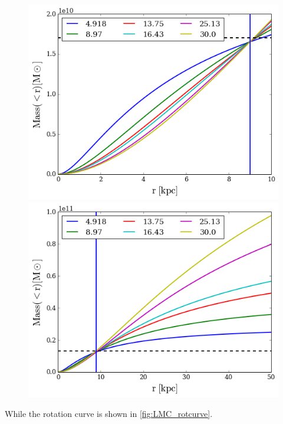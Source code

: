 \begin{figure}[H]{\label{fig:LMC_mass}}
\centering
\includegraphics[scale=0.4]{LMC_mass_hernquist.png}
\includegraphics[scale=0.4]{LMC_mass_hernquist_out.png}
\end{figure}

While the rotation curve is shown in \ref{fig:LMC_rotcurve}.

